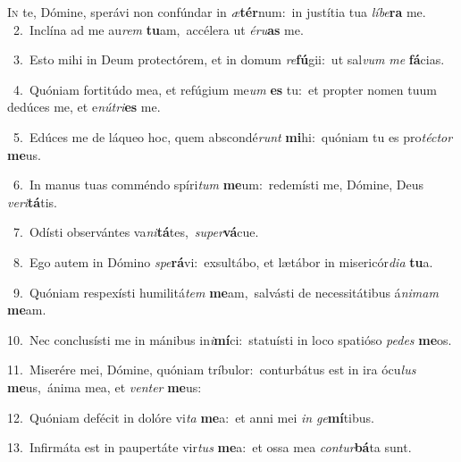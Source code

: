 \lettrine{\initial\textcolor{\initialcolor}{I}}{n} te, Dómine, sperávi non confúndar in \textit{æ}\-\textbf{tér}num:~\star in justítia tua \textit{lí}\-\textit{be}\textbf{ra} me.\\
{\numbfont\textcolor{\numbcolor}{~2.}}~Inclína ad me au\textit{rem} \textbf{tu}\-am,~\star accélera ut \textit{é}\-\textit{ru}\textbf{as} me.\par
{\numbfont\textcolor{\numbcolor}{~3.}}~Esto mihi in Deum protectórem, et in domum \textit{re}\-\textbf{fú}gii:~\star ut sal\textit{vum} \textit{me} \textbf{fá}\-cias.\par
{\numbfont\textcolor{\numbcolor}{~4.}}~Quóniam fortitúdo mea, et refúgium me\textit{um} \textbf{es} tu:~\star et propter nomen tuum dedúces me, et e\-\textit{nú}\-\textit{tri}\textbf{es} me.\par
{\numbfont\textcolor{\numbcolor}{~5.}}~Edúces me de láqueo hoc, quem abscondé\textit{runt} \textbf{mi}\-hi:~\star quóniam tu es pro\-\textit{téc}\-\textit{tor} \textbf{me}\-us.\par
{\numbfont\textcolor{\numbcolor}{~6.}}~In manus tuas comméndo spíri\textit{tum} \textbf{me}\-um:~\star redemísti me, Dómine, Deus \textit{ve}\-\textit{ri}\textbf{tá}tis.\par
{\numbfont\textcolor{\numbcolor}{~7.}}~Odísti observántes va\-\textit{ni}\-\textbf{tá}tes,~\star \textit{su}\-\textit{per}\textbf{vá}cue.\par
{\numbfont\textcolor{\numbcolor}{~8.}}~Ego autem in Dómino \textit{spe}\-\textbf{rá}vi:~\star exsultábo, et lætábor in misericór\-\textit{di}\-\textit{a} \textbf{tu}\-a.\par
{\numbfont\textcolor{\numbcolor}{~9.}}~Quóniam respexísti humilitá\textit{tem} \textbf{me}\-am,~\star salvásti de necessitátibus á\-\textit{ni}\-\textit{mam} \textbf{me}\-am.\par
{\numbfont\textcolor{\numbcolor}{10.}}~Nec conclusísti me in mánibus in\-\textit{i}\-\textbf{mí}ci:~\star statuísti in loco spatióso \textit{pe}\-\textit{des} \textbf{me}\-os.\par
{\numbfont\textcolor{\numbcolor}{11.}}~Miserére mei, Dómine, quóniam tríbulor:~\dagger conturbátus est in ira ócu\textit{lus} \textbf{me}\-us,~\star ánima mea, et \textit{ven}\-\textit{ter} \textbf{me}\-us:\par
{\numbfont\textcolor{\numbcolor}{12.}}~Quóniam defécit in dolóre vi\textit{ta} \textbf{me}\-a:~\star et anni mei \textit{in} \textit{ge}\-\textbf{mí}tibus.\par
{\numbfont\textcolor{\numbcolor}{13.}}~Infirmáta est in paupertáte vir\textit{tus} \textbf{me}\-a:~\star et ossa mea \textit{con}\-\textit{tur}\textbf{bá}ta sunt.\par
